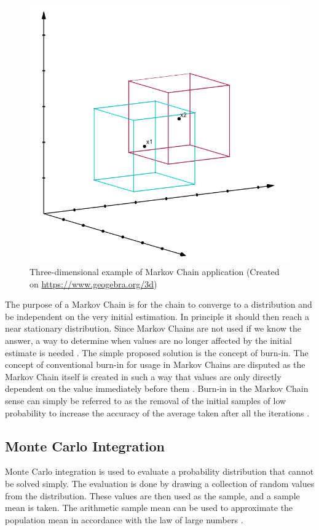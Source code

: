 	\begin{figure}	
	\centering
	\includegraphics[width=0.55\linewidth]{figures/MC_cubes.png}
	\caption{Three-dimensional example of Markov Chain application (Created on \url{https://www.geogebra.org/3d})}
	\label{cubeexplfig}
	\end{figure}
	
	The purpose of a Markov Chain is for the chain to converge to a distribution and be independent on the very initial estimation. 
	In principle it should then reach a near stationary distribution.
	Since Markov Chains are not used if we know the answer, a way to determine when values are no longer affected by the initial estimate is needed \cite{Gilks:1996}. 
	The simple proposed solution is the concept of burn-in. 
	The concept of conventional burn-in for usage in Markov Chains are disputed as the Markov Chain itself is created in such a way that values are only directly dependent on the value immediately before them \cite{Meyn:1993}.
	Burn-in in the Markov Chain sense can simply be referred to as the removal of the initial samples of low probability to increase the accuracy of the average taken after all the iterations \cite{John:2016}.
	
	
	
		
	\subsection{Monte Carlo Integration}\label{MCint_sec}
	Monte Carlo integration is used to evaluate a probability distribution that cannot be solved simply. 
	The evaluation is done by drawing a collection of random values from the distribution.
	These values are then used as the sample, and a sample mean is taken.
	The arithmetic sample mean can be used to approximate the population mean in accordance with the law of large numbers \citep{Gilks:1996}.
	
